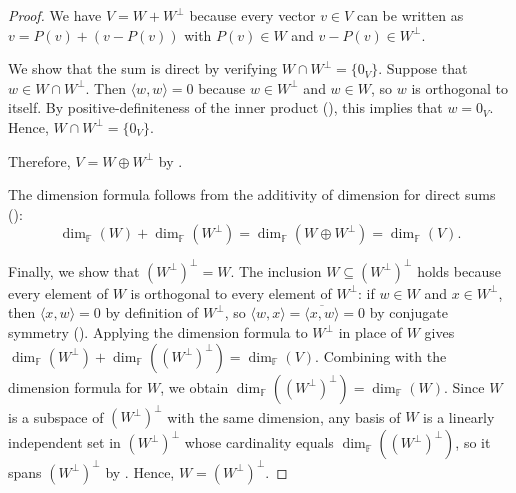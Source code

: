 \begin{proof}
    We have $V = W + W^{\perp}$ because every vector $v \in V$ can be written as $v = P(v) + (v - P(v))$ with $P(v) \in W$ and $v - P(v) \in W^{\perp}$.

    We show that the sum is direct by verifying $W \cap W^{\perp} = \{0_V\}$. Suppose that $w \in W \cap W^{\perp}$. Then $\langle w, w \rangle = 0$ because $w \in W^{\perp}$ and $w \in W$, so $w$ is orthogonal to itself. By positive-definiteness of the inner product (), this implies that $w = 0_V$. Hence, $W \cap W^{\perp} = \{0_V\}$.

    Therefore, $V = W \oplus W^{\perp}$ by .

    The dimension formula follows from the additivity of dimension for direct sums ():
    $$\dim_{\mathbb{F}}(W) + \dim_{\mathbb{F}}(W^{\perp}) = \dim_{\mathbb{F}}(W \oplus W^{\perp}) = \dim_{\mathbb{F}}(V).$$

    Finally, we show that $(W^{\perp})^{\perp} = W$. The inclusion $W \subseteq (W^{\perp})^{\perp}$ holds because every element of $W$ is orthogonal to every element of $W^{\perp}$: if $w \in W$ and $x \in W^{\perp}$, then $\langle x, w \rangle = 0$ by definition of $W^{\perp}$, so $\langle w, x \rangle = \overline{\langle x, w \rangle} = 0$ by conjugate symmetry (). Applying the dimension formula to $W^{\perp}$ in place of $W$ gives $\dim_{\mathbb{F}}(W^{\perp}) + \dim_{\mathbb{F}}((W^{\perp})^{\perp}) = \dim_{\mathbb{F}}(V)$. Combining with the dimension formula for $W$, we obtain $\dim_{\mathbb{F}}((W^{\perp})^{\perp}) = \dim_{\mathbb{F}}(W)$. Since $W$ is a subspace of $(W^{\perp})^{\perp}$ with the same dimension, any basis of $W$ is a linearly independent set in $(W^{\perp})^{\perp}$ whose cardinality equals $\dim_{\mathbb{F}}((W^{\perp})^{\perp})$, so it spans $(W^{\perp})^{\perp}$ by . Hence, $W = (W^{\perp})^{\perp}$.
\end{proof}
